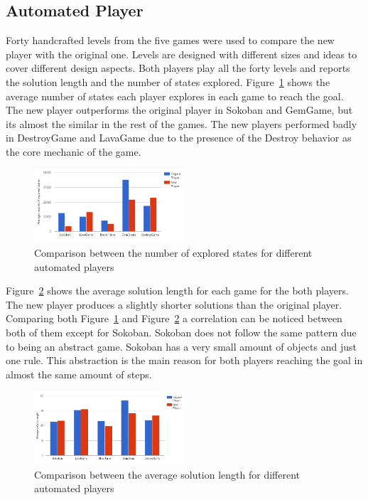 \documentclass[letterpaper]{article}
\newcommand{\figref}[1]{Figure~\ref{Figure:#1}}
\begin{document}
\subsection{Automated Player}
Forty handcrafted levels from the five games were used to compare the new player with the original one. Levels are designed with different sizes and ideas to cover different design aspects. Both players play all the forty levels and reports the solution length and the number of states explored. \figref{automatedPlayerPerformance} shows the average number of states each player explores in each game to reach the goal. The new player outperforms the original player in Sokoban and GemGame, but its almost the similar in the rest of the games. The new players performed badly in DestroyGame and LavaGame due to the presence of the Destroy behavior as the core mechanic of the game.\\\par

\begin{figure}[ht]
  	\centering
    \includegraphics[width=0.5\textwidth]{Images/automatedPlayerPerformance}
    \caption{Comparison between the number of explored states for different automated players}
    \label{Figure:automatedPlayerPerformance}
\end{figure}

\figref{automatedPlayerLength} shows the average solution length for each game for the both players. The new player produces  a slightly shorter solutions than the original player. Comparing both \figref{automatedPlayerPerformance} and \figref{automatedPlayerLength} a correlation can be noticed between both of them except for Sokoban. Sokoban does not follow the same pattern due to being an abstract game. Sokoban has a very small amount of objects and just one rule. This abstraction is the main reason for both players reaching the goal in almost the same amount of steps.

\begin{figure}[ht]
  	\centering
    \includegraphics[width=0.5\textwidth]{Images/automatedPlayerLength}
    \caption{Comparison between the average solution length for different automated players}
    \label{Figure:automatedPlayerLength}
\end{figure}
\end{document}
